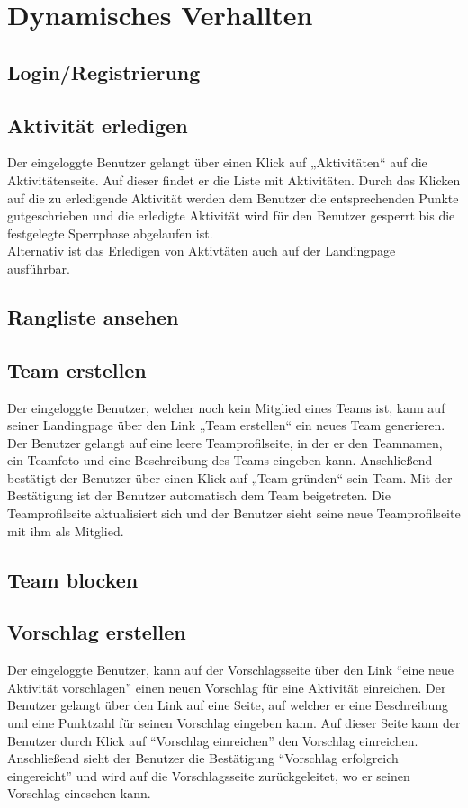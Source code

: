 \section{Dynamisches Verhallten}
\subsection{Login/Registrierung}
\subsection{Aktivität erledigen}
Der eingeloggte Benutzer gelangt über einen Klick auf „Aktivitäten“ auf die Aktivitätenseite. Auf dieser findet er die Liste mit Aktivitäten. Durch das Klicken auf die zu erledigende Aktivität werden dem Benutzer die entsprechenden Punkte gutgeschrieben und die erledigte Aktivität wird für den Benutzer gesperrt bis die festgelegte Sperrphase abgelaufen ist.\\
Alternativ ist das Erledigen von Aktivtäten auch auf der Landingpage ausführbar.\\
\subsection{Rangliste ansehen}
\subsection{Team erstellen}
Der eingeloggte Benutzer, welcher noch kein Mitglied eines Teams ist, kann auf seiner Landingpage über den Link „Team erstellen“ ein neues Team generieren. Der Benutzer gelangt auf eine leere Teamprofilseite, in der er den Teamnamen, ein Teamfoto und eine Beschreibung des Teams eingeben kann. Anschließend bestätigt der Benutzer über einen Klick auf „Team gründen“ sein Team. Mit der Bestätigung ist der Benutzer automatisch dem Team beigetreten. Die Teamprofilseite aktualisiert sich und der Benutzer sieht seine neue Teamprofilseite mit ihm als Mitglied.\\
\subsection{Team blocken}
\subsection{Vorschlag erstellen}
Der eingeloggte Benutzer, kann auf der Vorschlagsseite über den Link
``eine neue Aktivität vorschlagen'' einen neuen Vorschlag für eine
Aktivität einreichen. Der Benutzer gelangt über den Link auf eine
Seite, auf welcher er eine Beschreibung und eine Punktzahl für seinen Vorschlag
 eingeben kann. Auf dieser Seite kann der Benutzer durch Klick auf
 ``Vorschlag einreichen'' den Vorschlag einreichen. Anschließend sieht
 der Benutzer die Bestätigung ``Vorschlag erfolgreich eingereicht''
 und wird auf die Vorschlagsseite zurückgeleitet, wo er seinen
 Vorschlag einesehen kann.\\
 
